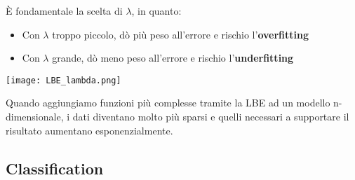 \noindent È fondamentale la scelta di $\lambda$, in quanto:
\begin{itemize}
	\item Con $\lambda$ troppo piccolo, dò più peso all'errore e rischio l'\textbf{overfitting}
	\item Con $\lambda$ grande, dò meno peso all'errore e rischio l'\textbf{underfitting}
\end{itemize}
\begin{center}
	\texttt{[image: LBE\_lambda.png]}
\end{center}

\begin{observation}
	Quando aggiungiamo funzioni più complesse tramite la LBE ad un modello n-dimensionale, i dati diventano molto più sparsi e quelli necessari a supportare il risultato aumentano esponenzialmente.
\end{observation}

\subsection{Classification}


